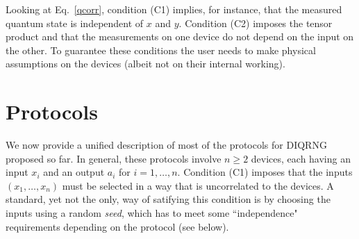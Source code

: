\documentclass[11pt,a4paper]{article}
\begin{document}
Looking at Eq.~\eqref{qcorr}, condition (C1) implies, for instance, that the measured quantum state is independent of $x$ and $y$. Condition (C2)  imposes the tensor product and that the measurements on one device do not depend on the input on the other. To guarantee these conditions the user needs to make physical assumptions on the devices (albeit not on their internal working).

\section{Protocols}
\label{protocols}

We now provide a unified description of most of the protocols for DIQRNG proposed so far. %
In general, these protocols %
involve $n \geq 2$ devices, each having an input $x_i$ and an output $a_i$ for $i=1,\ldots, n$.
Condition (C1) imposes that the inputs $(x_1, \ldots, x_n)$ must be selected in a way that is uncorrelated to the devices. A standard, yet not the only, way of satifying this condition is by choosing the inputs using a random {\em seed}, which has to meet some ``independence" requirements depending on the protocol (see below).
\end{document}
